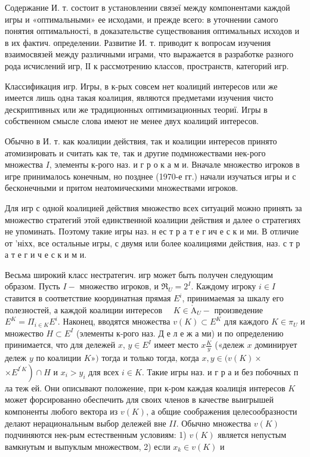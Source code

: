 \documentclass[10pt]{article}
\def\AA{\mathring{\mathrm{A}}}
\begin{document}
Содержание И. т. состоит в установлении связеї между компонентами каждой игры и «оптимальными» ее исходами, и прежде всего: в уточнении самого понятия оптимальності, в доказательстве существования оптимальных исходов и в их фактич. определении. Развитие И. т. приводит к вопросам изучения взаимосвязей между различными играми, что выражается в разработке разного рода исчислений игр, ІІ к рассмотрению классов, пространств, категорий игр.



Классификация игр. Игры, в к-рых совсем нет коалиций интересов или же имеется лишь одна такая коалиция, являются предметами изучения чисто дескриптивных или же традиционных оптимизационных теориї. Игры в собственном смысле слова имеют не менее двух коалиций интересов.



Обычно в И. т. как коалиции действия, так и коалиции интересов принято атомизировать и считать как те, так и другие подмножествами нек-рого множества $I$, элементы к-рого наз. и г р о к а м и. Вначале множество игроков в игре принималось конечным, но позднее (1970-е гг.) начали изучаться игры и с бесконечными и притом неатомическими множествами игроков.



Для игр с одной коалицией действия множество всех ситуаций можно принять за множество стратегий этой единственной коалиции действия и далее о стратегиях не упоминать. Поэтому такие игры наз. н ес т р а т е г ич е с к и ми. В отличие от 'ніхх, все остальные игры, с двумя или более коалициями действия, наз. с т р а т е г и ч е с к и м и.



Весьма широкий класс нестратегич. игр может быть получен следующим образом. Пусть $I-$ множество игроков, и $\Re_{U}=2^{I}$. Каждому игроку $i \in I$ ставится в соответствие координатная прямая $E^{i}$, принимаемая за шкалу его полезностей, а каждой коалиции интересов $\quad K \in \AA_{U}-$ произведение $E^{K}=\Pi_{i \in K} E^{i}$. Наконец, вводятся множества $v(K) \subset E^{K}$ для каждого $K \in \pi_{U}$ и множество $H \subset E^{I}$ (элементы к-рого наз. Д е л е ж а ми) и по определению принимается, что для дележей $x$, $y \in E^{I}$ имеет место $x \frac{K}{y}$ («дележ $x$ доминирует дележ $y$ по коалиции $K »)$ тогда и только тогда, когда $x, y \in(v(K) \times$ $\left.\times E^{I^{\prime} K}\right) \cap H$ и $x_{i}>y_{i}$ для всех $i \in K$. Такие игры наз. и г р а и без побочных п ла теж ей. Они описывают положение, при к-ром каждая коалиція интересов $K$ может форсированно обеспечить для своих членов в качестве выигрышей компоненты любого вектора из $v(K)$, а общие соображения целесообразности делают нерациональным выбор дележей вне $I I$. Обычно множества $v(K)$ подчиняются нек-рым естественным условиям: 1) $v(K)$ является непустым вамкнутым и выпуклым множеством, 2) если $x_{k} \in v(K)$ и
\end{document}
